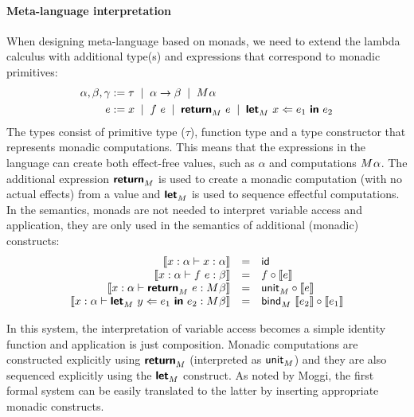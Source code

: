 
\paragraph{Meta-language interpretation} When designing meta-language based on monads, we need to
extend the lambda calculus with additional type(s) and expressions that correspond to monadic
primitives:
%
\begin{align*}
\alpha, \beta, \gamma &:= \tau \sep \alpha \rightarrow \beta \sep \mtyp{}{\alpha} \\
e &:= x \sep f~e \sep \kvd{return}_\mtyp{}{}~e \sep \kvd{let}_\mtyp{}{}~x \Leftarrow e_1~\kvd{in}~e_2
\end{align*}
%
The types consist of primitive type ($\tau$), function type and a type constructor that 
represents monadic computations. This means that the expressions in the language can create both
effect-free values, such as $\alpha$ and computations $M^{}\alpha$. The additional expression
$\textnormal{\bfseries\sffamily return}_M^{}$ is used to create a monadic computation (with no actual effects) from a
value and $\textnormal{\bfseries\sffamily let}_M^{}$ is used to sequence effectful computations. In the semantics, 
monads are not needed to interpret variable access and application, they are only used in the 
semantics of additional (monadic) constructs:
%
\begin{equation*}
\begin{array}{rcl}
\llbracket x:\alpha \vdash x : \alpha \rrbracket &=& {\textnormal{\sffamily id}}_{}\\
\llbracket x:\alpha \vdash f~e : \beta \rrbracket &=& f \circ \llbracket e \rrbracket\\
\llbracket x:\alpha \vdash \textnormal{\bfseries\sffamily return}_M^{}~e : M^{}\beta \rrbracket &=& \textnormal{\sffamily unit}_M^{} \circ \llbracket e \rrbracket\\
\llbracket x:\alpha \vdash \textnormal{\bfseries\sffamily let}_M^{}~y \Leftarrow e_1~\textnormal{\bfseries\sffamily in}~e_2 : M^{}\beta \rrbracket &=& 
  \textnormal{\sffamily bind}_M^{}~\llbracket e_2 \rrbracket \circ \llbracket e_1 \rrbracket
\end{array}
\end{equation*}

\noindent
In this system, the interpretation of variable access becomes a simple identity function and
application is just composition. Monadic computations are constructed explicitly using 
$\textnormal{\bfseries\sffamily return}_M^{}$ (interpreted as $\textnormal{\sffamily unit}_M^{}$) and they are also sequenced
explicitly using the $\textnormal{\bfseries\sffamily let}_M^{}$ construct. As noted by Moggi, the first formal system
can be easily translated to the latter by inserting appropriate monadic constructs.

